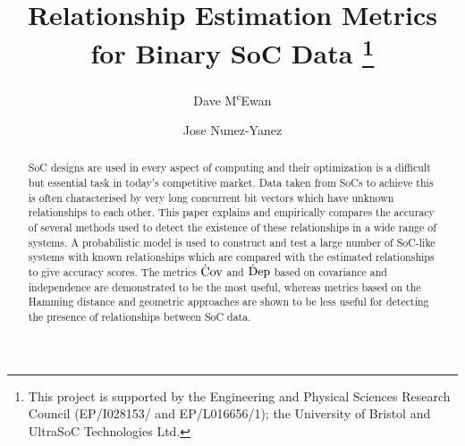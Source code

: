\documentclass[runningheads]{llncs}
\newcommand{\doctitle}{Relationship Estimation Metrics for Binary SoC Data}
\begin{document}

\title{\doctitle
  \thanks{This project is supported by the Engineering and Physical Sciences
  Research Council (EP/I028153/ and EP/L016656/1);
  the University of Bristol and UltraSoC Technologies Ltd.
  }
}

\author{
  Dave M\textsuperscript{c}Ewan%
  \and Jose Nunez-Yanez%
}



\maketitle

\begin{abstract}
\gls{SoC} designs are used in every aspect of computing and their optimization
is a difficult but essential task in today's competitive market.
Data taken from \gls{SoC}s to achieve this is often characterised by very long
concurrent bit vectors which have unknown relationships to each other.
This paper explains and empirically compares the accuracy of several methods
used to detect the existence of these relationships in a wide range of systems.
A probabilistic model is used to construct and test a large number of
\gls{SoC}-like systems with known relationships which are compared with the
estimated relationships to give accuracy scores.
The metrics $\operatorname{\dot{C}ov}$ and $\operatorname{\dot{D}ep}$ based on covariance and independence are
demonstrated to be the most useful, whereas metrics based on the Hamming
distance and geometric approaches are shown to be less useful for detecting the
presence of relationships between \gls{SoC} data.

\end{abstract}

\end{document}
